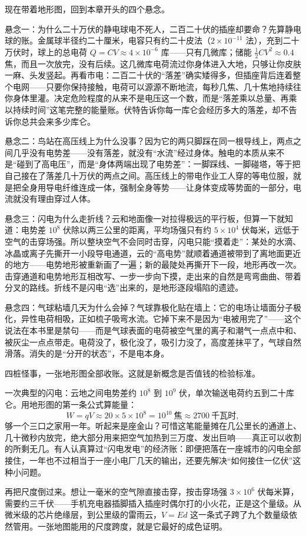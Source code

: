 \begin{mainline}
现在带着地形图，回到本章开头的四个悬念。

悬念一：为什么二十万伏的静电球电不死人，二百二十伏的插座却要命？先算静电球的账。金属球半径约二十厘米，电容只有约二十皮法（\(2\times10^{-11}\) 法），充到二十万伏时，球上的总电荷 \(Q=CV\approx 4\times10^{-6}\) 库——只有几微库；储能 \(\frac12 CV^2\approx 0.4\) 焦，而且一次放完，没有后续。这几微库电荷流过你身体进入大地，只够让你皮肤一麻、头发竖起。再看市电：二百二十伏的“落差”确实矮得多，但插座背后连着整个电网——只要你保持接触，电荷可以源源不断地流，每秒几焦、几十焦地持续往你身体里灌。决定危险程度的从来不是电压这一个数，而是“落差乘以总量、再乘以持续时间”这笔完整的能量账。伏特告诉你每一库仑会经历多大的落差，却不告诉你总共会来多少库仑。

悬念二：鸟站在高压线上为什么没事？因为它的两只脚踩在同一根导线上，两点之间几乎没有电势差——没有落差，就没有“水流”经过身体。触电的本质从来不是“碰到了高电压”，而是“身体两端出现了电势差”：一脚踩线、一脚碰塔，等于把自己接在了落差几十万伏的两点之间。高压线上的带电作业工人穿的等电位服，就是把全身用导电纤维连成一体，强制全身等势——让身体变成等势面的一部分，电流就没有理由穿过人体。

悬念三：闪电为什么走折线？云和地面像一对拉得极远的平行板，但算一下就知道：电势差 \(10^{8}\) 伏除以两三公里的距离，平均场强只有约 \(5\times10^{4}\) 伏每米，远低于空气的击穿场强。所以整块空气不会同时击穿，闪电只能“摸着走”：某处的水滴、冰晶或离子先撕开一小段导电通道，云的“高电势”就顺着通道被带到了离地面更近的地方——电势地形被重新画了一遍；新的最陡处再撕开下一段，地形再改一次。击穿通道和电势地形互相改写、一步一步向下摸，走出来的自然是弯弯曲曲、带着分叉的路线。折线不是闪电“选”出来的，是地形逐段塌陷的遗迹。

悬念四：气球粘墙几天为什么会掉？气球靠极化贴在墙上：它的电场让墙面分子极化，异性电荷相吸，正如梳子吸弯水流。它掉下来不是因为“电被用完了”——这个说法在本书里是禁句——而是气球表面的电荷被空气里的离子和潮气一点点中和、被灰尘一点点带走。电荷没了，极化没了，吸引力没了，高度差抹平了，气球自然滑落。消失的是“分开的状态”，不是电本身。

四桩怪事，一张地形图全部收账。这就是新概念是否值钱的检验标准。
\end{mainline}


\begin{thought}[把雷雨云和地面当成一块平行板电容器]
一次典型的闪电：云地之间电势差约 \(10^{8}\) 到 \(10^{9}\) 伏，单次输送电荷约五到二十库仑。用地形图的第一条公式算能量：
\[
W = qV \approx 20\times 5\times10^{8} = 10^{10}\ \text{焦} \approx 2700\ \text{千瓦时},
\]
够一个三口之家用一年。听起来是座金山？可惜这笔能量摊在几公里长的通道上、几十微秒内放完，绝大部分用来把空气加热到三万度、发出巨响——真正可以收割的所剩无几。有人认真算过“闪电发电”的经济账：即便把落在一座城市的闪电全部接住，一年也不过相当于一座小电厂几天的输出，还要先解决“如何接住一亿伏”这种小问题。

再把尺度倒过来。想让一毫米的空气隙直接击穿，按击穿场强 \(3\times10^{6}\) 伏每米算，需要约三千伏——手机充电器插脚插入插座时偶尔打的小火花，正是这个量级。从微米级的芯片绝缘层，到公里级的雷雨云，\(V=Ed\) 这一条式子跨了九个数量级依然管用。一张地图能用的尺度跨度，就是它最好的成色证明。
\end{thought}


